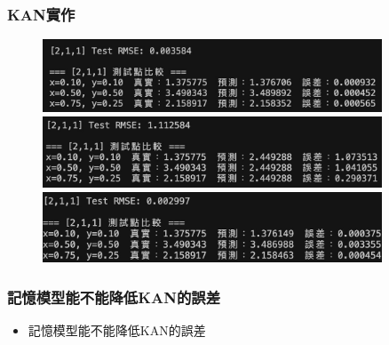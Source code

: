 \documentclass{beamer}
\begin{document}
\begin{frame}
    \frametitle{KAN實作}
    \begin{figure}
        \centering
        \begin{minipage}{\textwidth}
            \includegraphics[width=0.9\textwidth,height=0.4\textheight,keepaspectratio]{figures/211比較1.jpg}
            \centering
            
        \end{minipage}
        
        \vspace{0.5em}
        
        \begin{minipage}{\textwidth}
            \includegraphics[width=0.9\textwidth,height=0.5\textheight,keepaspectratio]{figures/211比較6.jpg}
            \centering
            
        \end{minipage}

        \begin{minipage}{\textwidth}
            \includegraphics[width=0.9\textwidth,height=0.5\textheight,keepaspectratio]{figures/211比較12.jpg}
            \centering
            
        \end{minipage}
    \end{figure}
\end{frame}

\begin{frame}
    \frametitle{記憶模型能不能降低KAN的誤差}
    \begin{itemize}
        \item 記憶模型能不能降低KAN的誤差
    \end{itemize}
\end{frame}
\end{document}
